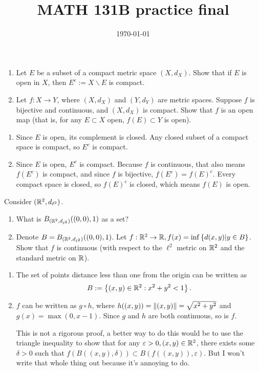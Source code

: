 \documentclass{article}
\date{\today}
\title{MATH 131B practice final}
\begin{document}
\maketitle

\begin{prob}
    \begin{enumerate}[label=(\alph*)]
        \item Let $E$ be a subset of a compact metric space $(X, d_X)$. Show that if $E$ is open in $X$, then $E^c := X \backslash E$ is compact.
        \item Let $f: X \rightarrow Y$, where $(X,d_X)$ and $(Y, d_Y)$ are metric spaces. Suppose $f$ is bijective and continuous, and $(X,d_X)$ is compact. Show that $f$ is an open map (that is, for any $E \subset X$ open, $f(E) \subset Y$ is open).
    \end{enumerate}
\end{prob}
\begin{enumerate}[label=(\alph*)]
    \item Since $E$ is open, its complement is closed. Any closed subset of a compact space is compact, so $E^c$ is compact.
    \item Since $E$ is open, $E^c$ is compact. Because $f$ is continuous, that also means $f(E^c)$ is compact, and since $f$ is bijective, $f(E^c)=f(E)^c$. Every compact space is closed, so $f(E)^c$ is closed, which means $f(E)$ is open.
\end{enumerate}


\bigskip
\begin{prob}
    Consider $(\mathbb{R}^2, d_{\ell^2})$.
    \begin{enumerate}[label=(\alph*)]
        \item What is $B_{(\mathbb{R}^2, d_{\ell^2})}((0,0), 1)$ as a set?
        \item Denote $B = B_{(\mathbb{R}^2, d_{\ell^2})}((0,0),1)$. Let $f: \mathbb{R}^2 \rightarrow \mathbb{R}, f(x) = \inf \left\{ d(x,y) | y \in B \right\}$. Show that $f$ is continuous (with respect to the $\ell^2$ metric on $\mathbb{R}^2$ and the standard metric on $\mathbb{R}$).
    \end{enumerate}
\end{prob}
\begin{enumerate}[label=(\alph*)]
    \item The set of points distance less than one from the origin can be written as
        \[ B := \left\{ (x,y) \in \mathbb{R}^2 : x^2+y^2 < 1 \right\}. \]
    \item $f$ can be written as $g \circ h$, where $h((x,y)) = \left\lVert (x,y)\right\rVert = \sqrt{x^2+y^2}$ and $g(x)=\max(0, x-1)$. Since $g$ and $h$ are both continuous, so is $f$.\par
        This is not a rigorous proof, a better way to do this would be to use the triangle inequality to show that for any $\varepsilon > 0, (x,y) \in \mathbb{R}^2$, there exists some $\delta > 0$ such that $f(B((x,y),\delta))\subset B(f((x,y)), \varepsilon)$. But I won't write that whole thing out because it's annoying to do.
\end{enumerate}
\end{document}
